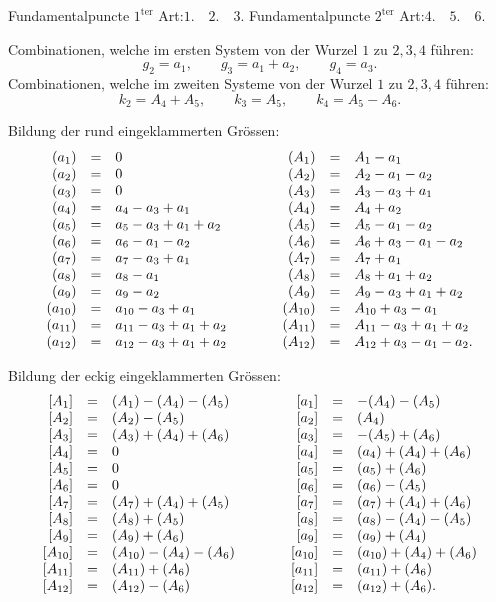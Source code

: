 \documentclass[10pt]{article}
\begin{document}
\noindent Fundamentalpuncte \(1^{\mathrm{ter}}\) Art:\quad \(1.\quad2.\quad3.\)
\hfill Fundamentalpuncte \(2^{\mathrm{ter}}\) Art:\quad \(4.\quad5.\quad6.\)

\noindent Combinationen, welche im ersten System von der Wurzel \(1\) zu \(2,3,4\) führen:
\[
g_2=a_1,\qquad g_3=a_1+a_2,\qquad g_4=a_3.
\]
Combinationen, welche im zweiten Systeme von der Wurzel \(1\) zu \(2,3,4\) führen:
\[
k_2=A_4+A_5,\qquad k_3=A_5,\qquad k_4=A_5-A_6.
\]

\noindent Bildung der rund eingeklammerten Grössen:
\[
\begin{array}{rcl@{\qquad\qquad}rcl}
(a_1)&=&0&(A_1)&=&A_1-a_1\\
(a_2)&=&0&(A_2)&=&A_2-a_1-a_2\\
(a_3)&=&0&(A_3)&=&A_3-a_3+a_1\\
(a_4)&=&a_4-a_3+a_1&(A_4)&=&A_4+a_2\\
(a_5)&=&a_5-a_3+a_1+a_2&(A_5)&=&A_5-a_1-a_2\\
(a_6)&=&a_6-a_1-a_2&(A_6)&=&A_6+a_3-a_1-a_2\\
(a_7)&=&a_7-a_3+a_1&(A_7)&=&A_7+a_1\\
(a_8)&=&a_8-a_1&(A_8)&=&A_8+a_1+a_2\\
(a_9)&=&a_9-a_2&(A_9)&=&A_9-a_3+a_1+a_2\\
(a_{10})&=&a_{10}-a_3+a_1&(A_{10})&=&A_{10}+a_3-a_1\\
(a_{11})&=&a_{11}-a_3+a_1+a_2&(A_{11})&=&A_{11}-a_3+a_1+a_2\\
(a_{12})&=&a_{12}-a_3+a_1+a_2&(A_{12})&=&A_{12}+a_3-a_1-a_2.
\end{array}
\]

\noindent Bildung der eckig eingeklammerten Grössen:
\[
\begin{array}{rcl@{\qquad\qquad}rcl}
{}[A_1]&=&(A_1)-(A_4)-(A_5)&[a_1]&=&-(A_4)-(A_5)\\
{}[A_2]&=&(A_2)-(A_5)&[a_2]&=&(A_4)\\
{}[A_3]&=&(A_3)+(A_4)+(A_6)&[a_3]&=&-(A_5)+(A_6)\\
{}[A_4]&=&0&[a_4]&=&(a_4)+(A_4)+(A_6)\\
{}[A_5]&=&0&[a_5]&=&(a_5)+(A_6)\\
{}[A_6]&=&0&[a_6]&=&(a_6)-(A_5)\\
{}[A_7]&=&(A_7)+(A_4)+(A_5)&[a_7]&=&(a_7)+(A_4)+(A_6)\\
{}[A_8]&=&(A_8)+(A_5)&[a_8]&=&(a_8)-(A_4)-(A_5)\\
{}[A_9]&=&(A_9)+(A_6)&[a_9]&=&(a_9)+(A_4)\\
{}[A_{10}]&=&(A_{10})-(A_4)-(A_6)&[a_{10}]&=&(a_{10})+(A_4)+(A_6)\\
{}[A_{11}]&=&(A_{11})+(A_6)&[a_{11}]&=&(a_{11})+(A_6)\\
{}[A_{12}]&=&(A_{12})-(A_6)&[a_{12}]&=&(a_{12})+(A_6).
\end{array}
\]
\end{document}
